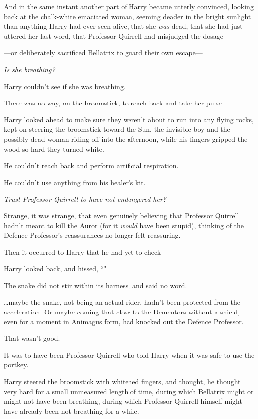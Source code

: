 And in the same instant another part of Harry became utterly convinced, looking back at the chalk-white emaciated woman, seeming deader in the bright sunlight than anything Harry had ever seen alive, that she \emph{was} dead, that she had just uttered her last word, that Professor Quirrell had misjudged the dosage—

—or deliberately sacrificed Bellatrix to guard their own escape—

\emph{Is she breathing?}

Harry couldn't see if she was breathing.

There was no way, on the broomstick, to reach back and take her pulse.

Harry looked ahead to make sure they weren't about to run into any flying rocks, kept on steering the broomstick toward the Sun, the invisible boy and the possibly dead woman riding off into the afternoon, while his fingers gripped the wood so hard they turned white.

He couldn't reach back and perform artificial respiration.

He couldn't use anything from his healer's kit.

\emph{Trust Professor Quirrell to have not endangered her?}

Strange, it was strange, that even genuinely believing that Professor Quirrell hadn't meant to kill the Auror (for it \emph{would} have been stupid), thinking of the Defence Professor's reassurances no longer felt reassuring.

Then it occurred to Harry that he had yet to check—

Harry looked back, and hissed, ``"

The snake did not stir within its harness, and said no word.

…maybe the snake, not being an actual rider, hadn't been protected from the acceleration. Or maybe coming that close to the Dementors without a shield, even for a moment in Animagus form, had knocked out the Defence Professor.

That wasn't good.

It was to have been Professor Quirrell who told Harry when it was safe to use the portkey.

Harry steered the broomstick with whitened fingers, and thought, he thought very hard for a small unmeasured length of time, during which Bellatrix might or might not have been breathing, during which Professor Quirrell himself might have already been not-breathing for a while.

